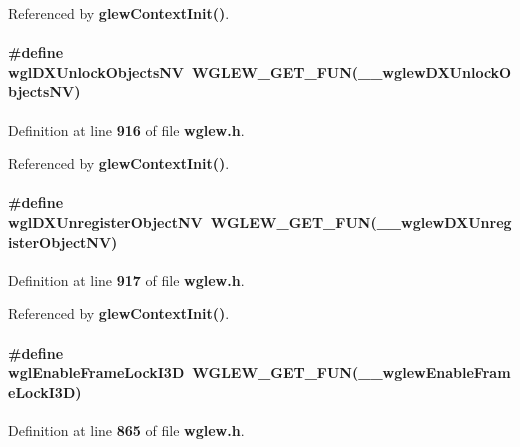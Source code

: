 Referenced by {\bf glew\+Context\+Init()}.

\paragraph[{wgl\+D\+X\+Unlock\+Objects\+NV}]{\setlength{\rightskip}{0pt plus 5cm}\#define wgl\+D\+X\+Unlock\+Objects\+NV~{\bf W\+G\+L\+E\+W\+\_\+\+G\+E\+T\+\_\+\+F\+UN}({\bf \+\_\+\+\_\+wglew\+D\+X\+Unlock\+Objects\+NV})}\label{wglew_8h_a7160e22620f2bd2e61ab074b082986c6}


Definition at line {\bf 916} of file {\bf wglew.\+h}.



Referenced by {\bf glew\+Context\+Init()}.

\paragraph[{wgl\+D\+X\+Unregister\+Object\+NV}]{\setlength{\rightskip}{0pt plus 5cm}\#define wgl\+D\+X\+Unregister\+Object\+NV~{\bf W\+G\+L\+E\+W\+\_\+\+G\+E\+T\+\_\+\+F\+UN}({\bf \+\_\+\+\_\+wglew\+D\+X\+Unregister\+Object\+NV})}\label{wglew_8h_a50a8f6f128557e294530926853179e3b}


Definition at line {\bf 917} of file {\bf wglew.\+h}.



Referenced by {\bf glew\+Context\+Init()}.

\paragraph[{wgl\+Enable\+Frame\+Lock\+I3D}]{\setlength{\rightskip}{0pt plus 5cm}\#define wgl\+Enable\+Frame\+Lock\+I3D~{\bf W\+G\+L\+E\+W\+\_\+\+G\+E\+T\+\_\+\+F\+UN}({\bf \+\_\+\+\_\+wglew\+Enable\+Frame\+Lock\+I3D})}\label{wglew_8h_a49dd29013698242ccb0054a034c9079c}


Definition at line {\bf 865} of file {\bf wglew.\+h}.



